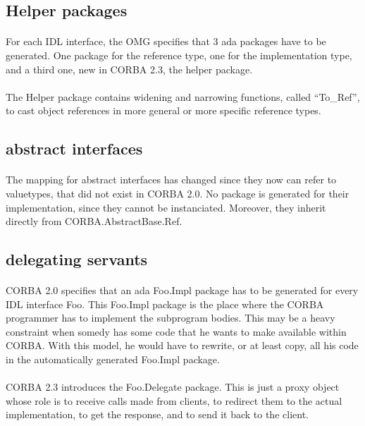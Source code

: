\subsection{Helper packages}
\paragraph{}For each IDL interface, the OMG specifies that 3 ada packages have to
be generated. One package for the reference type, one for the
implementation type, and a third one, new in CORBA 2.3, the helper
package.

\paragraph{}The Helper package contains widening and narrowing
functions, called ``To\_Ref'', to cast object references in more
general or more specific reference types.

\subsection{abstract interfaces}
\paragraph{}The mapping for abstract interfaces has changed since they
now can refer to valuetypes, that did not exist in CORBA 2.0. No
package is generated for their implementation, since they cannot be
instanciated. Moreover, they inherit directly from CORBA.AbstractBase.Ref.

\subsection{delegating servants}
\paragraph{}CORBA 2.0 specifies that an ada Foo.Impl package has to be generated
for every IDL interface Foo. This Foo.Impl package is the place where
the CORBA programmer has to implement the subprogram bodies. This may
be a heavy constraint when somedy has some code that he wants to make
available within CORBA. With this model, he would have to rewrite, or
at least copy, all his code in the automatically generated Foo.Impl
package.

\paragraph{}CORBA 2.3 introduces the Foo.Delegate package. This is
just a proxy object whose role is to receive calls made from clients,
to redirect them to the actual implementation, to get the response,
and to send it back to the client.


